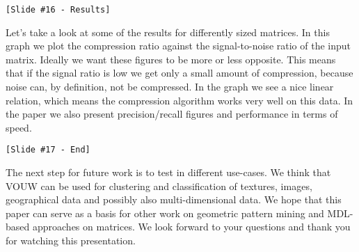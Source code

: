 \documentclass[10pt,a4paper,oneside]{article}
\begin{document}
\begin{verbatim}
[Slide #16 - Results]
\end{verbatim} 

Let's take a look at some of the results for differently sized matrices. In this graph we plot the compression ratio against the signal-to-noise ratio of the input matrix. Ideally we want these figures to be more or less opposite. This means that if the signal ratio is low we get only a small amount of compression, because noise can, by definition, not be compressed. In the graph we see a nice linear relation, which means the compression algorithm works very well on this data. In the paper we also present precision/recall figures and performance in terms of speed.

\begin{verbatim}
[Slide #17 - End]
\end{verbatim} 

The next step for future work is to test in different use-cases. We think that VOUW can be used for clustering and classification of textures, images, geographical data and possibly also multi-dimensional data. We hope that this paper can serve as a basis for other work on geometric pattern mining and MDL-based approaches on matrices. 
We look forward to your questions and thank you for watching this presentation.
\end{document}
